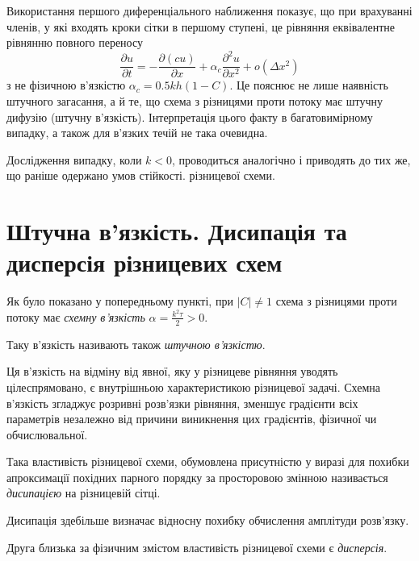 Використання першого диференціального наближення показує, що при врахуванні членів, у які входять кроки сітки в першому ступені, це рівняння еквівалентне рівнянню повного переносу
\begin{equation*}
    \frac{\partial u}{\partial t} = -\frac{\partial (cu)}{\partial x} + \alpha_c \frac{\partial^2 u}{\partial x^2} + o(\Delta x^2)
\end{equation*}
з не фізичною в'язкістю $\alpha_c = 0.5 k h (1 - C)$. Це пояснює не лише наявність штучного загасання, а й те, що схема з різницями проти потоку має штучну дифузію (штучну в'язкість). Інтерпретація цього факту в багатовимірному випадку, а також для в'язких течій не така очевидна. \medskip

Дослідження випадку, коли $k < 0$, проводиться аналогічно і приводять до тих же, що раніше одержано умов стійкості. різницевої схеми.

\section{Штучна в'язкість. Дисипація та дисперсія різницевих схем}

Як було показано у попередньому пункті, при $|C| \ne 1$ схема з різницями проти потоку має \emph{схемну в'язкість} $\alpha = \frac{k^2 \tau}{2} > 0$.

\begin{definition}
    Таку в'язкість називають також \emph{штучною в'язкістю}.
\end{definition}

Ця в'язкість на відміну від явної, яку у різницеве рівняння уводять цілеспрямовано, є внутрішньою характеристикою різницевої задачі. Схемна в'язкість згладжує розривні розв'язки рівняння, зменшує градієнти всіх параметрів незалежно від причини виникнення цих градієнтів, фізичної чи обчислювальної. 

\begin{definition}
    Така властивість різницевої схеми, обумовлена присутністю у виразі для похибки апроксимації похідних парного порядку за просторовою змінною називається \emph{дисипацією} на різницевій сітці.
\end{definition}

Дисипація здебільше визначає відносну похибку обчислення амплітуди розв'язку.

\begin{definition}
    Друга близька за фізичним змістом властивість різницевої схеми є \emph{дисперсія}.
\end{definition}

